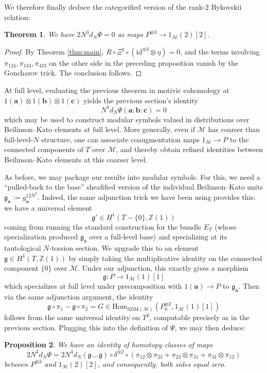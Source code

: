 \documentclass[a4paper,reqno,11pt]{amsart}
\theoremstyle{plain}
\newtheorem{theorem}{Theorem}[section]
\newtheorem{proposition}[theorem]{Proposition}
\theoremstyle{definition}
\theoremstyle{remark}
\newcommand{\Z}{\mathbb{Z}}
\newcommand{\DM}{\mathrm{DM}}
\newcommand{\Hom}{\mathrm{Hom}}
\begin{document}
We therefore finally deduce the categorified version of the rank-$2$ Bykovskii relation:
\begin{theorem} \label{thm:sheafrel}
    We have $2N^3d_N \Psi =0$ as maps $P^{\otimes 3} \to 1_{\mathcal{M}}(2)[2]$. 
\end{theorem}
\begin{proof}
    By Theorem \ref{thm:main}, $R\circ \Xi^\sharp \circ (\mathrm{id}^{\otimes 3} \otimes \eta)=0$, and the terms involving $\pi_{124},\pi_{143},\pi_{423}$ on the other side in the preceding proposition vanish by the Goncharov trick. The conclusion follows.
\end{proof}

At full level, evaluating the previous theorem in motivic cohomology at $1(\mathbf{a})\otimes 1(\mathbf{b})\otimes 1(\mathbf{c})$ yields the previous section's identity
\[
N^3d_N\Psi(\mathbf{a}:\mathbf{b}:\mathbf{c})=0
\]
which may be used to construct modular symbols valued in distributions over Beilinson--Kato elements at full level. More generally, even if $\mathcal{M}$ has coarser than full-level-$N$ structure, one can associate coaugmentation maps $1_{\mathcal{M}}\to P$ to the connected components of $T$ over $\mathcal{M}$, and thereby obtain refined identities between Beilinson--Kato elements at this coarser level.

As before, we may package our results into modular symbols. For this, we need a ``pulled-back to the base'' sheafified version of the individual Beilinson--Kato units $\mathfrak{g}_{\mathbf{a}}:=g_{\mathbf{a}}^{12 N^2}$. Indeed, the same adjunction trick we have been using provides this: we have a universal element
\[
    \mathfrak{g}'\in H^1(T-\{0\},\Z(1))
\]
coming from running the standard construction for the bundle $E_T$ (whose specialization produced $\mathfrak{g}_{\mathfrak{a}}$ over a full-level base) and specializing at its tautological $N$-torsion section. We upgrade this to an element $\mathfrak{g}\in H^1(T, \Z(1))$ by simply taking the multiplicative identity on the connected component $\{0\}$ over $\mathcal{M}$. Under our adjunction, this exactly gives a morphism
\[
    \mathfrak{g}: P \to 1_{\mathcal{M}}(1)[1]
\]
which specializes at full level under precomposition with $1(\mathbf{a})\to P$ to $\mathfrak{g}_{\mathbf{a}}$. Then via the same adjunction argument, the identity
\[
    \mathfrak{g} \circ \pi_1 - \mathfrak{g} \circ \pi_2 = G \in \Hom_{h\DM(\mathcal{M})}(P^{\otimes 2}_0, 1_{\mathcal{M}}(1)[1]) 
\]
follows from the same universal identity on $T^2$, computable precisely as in the previous section. Plugging this into the definition of $\Psi$, we may then deduce:
\begin{proposition}
We have an identity of homotopy classes of maps
    \[
    2N^3d_N\Psi = 2N^3d_N(\mathfrak{g} \smile \mathfrak{g}) \circ \delta^{\otimes 2} \circ (\pi_{12} \otimes \pi_{23}+\pi_{23} \otimes \pi_{31}+\pi_{31} \otimes \pi_{12})
    \]
between $P^{\otimes 3}$ and $1_{\mathcal{M}}(2)[2]$, and consequently, both sides equal zero.
\end{proposition}
\end{document}
